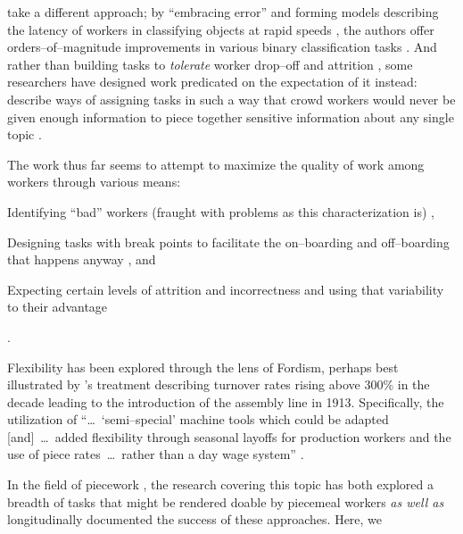 \documentclass[trackingWork]{subfiles}
\begin{document}
{    \citeauthor{embracingErrorKrishna} take a different approach;
    by ``embracing error'' and forming models describing the latency of workers in classifying objects at rapid speeds%
,     the authors offer orders--of--magnitude improvements
    in various binary classification tasks
    \cite{embracingErrorKrishna}.
    And rather than building tasks to \textit{tolerate} worker drop--off and attrition%
,     some researchers have designed work predicated on the expectation of it instead:
    \citeauthor{sensitiveTasks} describe ways of assigning tasks in such a way that
    crowd workers would never be given enough information to piece together sensitive information about
    any single topic
    \cite{sensitiveTasks}.

    The work thus far seems to attempt to maximize the quality of work among workers through various means:
    \begin{inlinelist}
      \item Identifying ``bad'' workers (fraught with problems as this characterization is) \cite{MaliciousCrowdworkersGadiraju}%
,       \item Designing tasks with break points to facilitate the on--boarding and off--boarding that happens anyway \cite{cheng2015break}, and
      \item Expecting certain levels of attrition and incorrectness and using that variability to their advantage \cite{embracingErrorKrishna}
    \end{inlinelist}.


    Flexibility has been explored through the lens of Fordism, perhaps best illustrated by
    \citeauthor{tolliday1986between}'s treatment describing
    turnover rates rising above 300\% in the decade leading to the introduction of the assembly line in 1913.
    Specifically, the utilization of ``\dots~`semi--special' machine tools which could be adapted
    [and]~\dots~added flexibility through seasonal layoffs for production workers and the use of
    piece rates~\dots~rather than a day wage system''
    \cite{tolliday1986between}.

    In the field of piecework%
,     the research covering this topic has both explored
    a breadth of tasks that might be rendered doable by piecemeal workers
    \textit{as well as} longitudinally documented the success of these approaches.
    Here, we 
}
\end{document}
